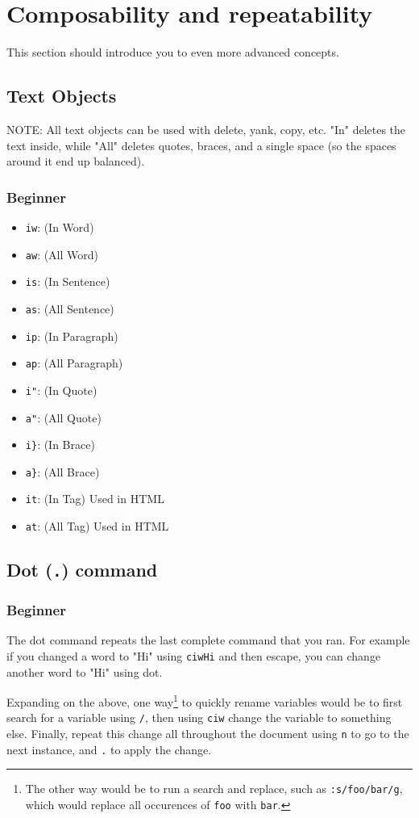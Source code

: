 \documentclass[11pt]{article}
\begin{document}
\section{Composability and repeatability}
\label{sec:orga36fbc8}
This section should introduce you to even more advanced concepts.
\subsection{Text Objects}
\label{sec:orgb236373}
NOTE: All text objects can be used with delete, yank, copy, etc. "In" deletes
the text inside, while "All" deletes quotes, braces, and a single space (so the
spaces around it end up balanced).
\subsubsection{Beginner}
\label{sec:orgca3b89b}
\begin{itemize}
\item \texttt{iw}: (In Word)
\item \texttt{aw}: (All Word)
\item \texttt{is}: (In Sentence)
\item \texttt{as}: (All Sentence)
\item \texttt{ip}: (In Paragraph)
\item \texttt{ap}: (All Paragraph)
\item \texttt{i"}: (In Quote)
\item \texttt{a"}: (All Quote)
\item \texttt{i\}}: (In Brace)
\item \texttt{a\}}: (All Brace)
\item \texttt{it}: (In Tag) Used in HTML
\item \texttt{at}: (All Tag) Used in HTML
\end{itemize}
\subsection{Dot (\texttt{.}) command}
\label{sec:org1948cb6}
\subsubsection{Beginner}
\label{sec:org88003d1}
The dot command repeats the last complete command that you ran. For example if
you changed a word to "Hi" using \texttt{ciwHi} and then escape, you can change another
word to "Hi" using dot.

Expanding on the above, one way\footnote{The other way would be to run a search and replace, such as \texttt{:s/foo/bar/g}, which
would replace all occurences of \texttt{foo} with \texttt{bar}.} to quickly rename variables would be to
first search for a variable using \texttt{/}, then using \texttt{ciw} change the variable to
something else. Finally, repeat this change all throughout the document using
\texttt{n} to go to the next instance, and \texttt{.} to apply the change.
\end{document}
